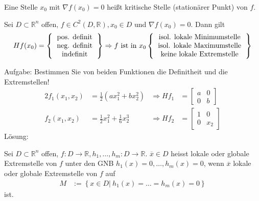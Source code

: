 \begin{defi}
 Eine Stelle $x_0$ mit $\nabla f(x_0)=0$ heißt kritische Stelle (stationärer Punkt) von $f$.
\end{defi}
\begin{satz}\label{satz:2}
Sei $D\subset\mathbb{R}^n$ offen, $f\in C^2(D,\mathbb{R}),x_0\in D$ und $\nabla f(x_0)=0$. Dann gilt 
\begin{align*}
H f(x_0)=\left\{\begin{tabular}{c}pos. definit\\neg. definit\\ indefinit \end{tabular} \right\}\Rightarrow f\text{ ist in }x_0\left\{\begin{tabular}{c}isol. lokale Minimumstelle\\
isol. lokale Maximumstelle\\
keine lokale Extremstelle \end{tabular} \right\}
\end{align*}
\end{satz}
\begin{uea}
Aufgabe: Bestimmen Sie von beiden Funktionen die Definitheit und die Extremstellen!
\begin{alignat*}{2}
f_1(x_1,x_2) & = \frac12\left(ax_1^2+bx_2^2\right) &\Rightarrow H f_1&=\begin{bmatrix} a & 0\\ 0 & b \end{bmatrix}\\
f_2(x_1,x_2) & = \frac12x_1^2+\frac16x_2^3 & \Rightarrow H f_2&=\begin{bmatrix} 1 & 0\\ 0 & x_2 \end{bmatrix}
\end{alignat*}
Lösung: 
\end{uea}
\begin{defi}
Sei $D\subset\mathbb{R}^n$ offen, $f:D\rightarrow\mathbb{R},h_1,\ldots,h_m:D\rightarrow\mathbb{R}$. $\overline{x}\in D$ heisst lokale oder globale Extremstelle von $f$ unter den
\ac{GNB} $h_1(x)=0,\ldots,h_m(x)=0$, wenn $\overline{x}$ lokale oder globale Extremstelle von $f$ auf
\begin{align*}
M &:=\left\{x\in D|\ h_1(x)=\ldots=h_m(x)=0\right\}
\end{align*}
ist.
\end{defi}
